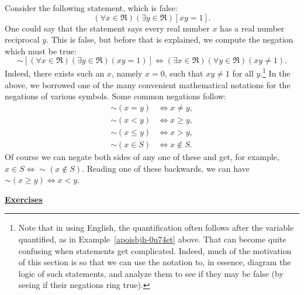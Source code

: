 \bex Consider the following statement, which is false:
$$(\forall x\in\Re)(\exists y\in \Re)[xy=1].$$
One could say that the statement says every real number $x$ has
a real number reciprocal $y$.  This is false, but before
that is explained, we compute the negation which must be true:
$$\sim[(\forall x\in\Re)(\exists y\in \Re)(xy=1)]
\iff(\exists x\in\Re)(\forall y\in\Re)(xy\ne 1).$$
Indeed, there exists such an $x$, namely $x=0$, such that $xy\ne 1$ for all 
$y$.\footnote{%
Note that in using English, the quantification often
follows after the variable quantified, as in 
Example~\ref{apoisbjh-0u74et} above.  That can become quite confusing
when statements get complicated.  Indeed, much of the motivation
of this section is so that we can use the notation to, in essence,
diagram the logic of such statements, and analyze them to see
if they may be false (by seeing if their negations ring true).%
}
\label{apoisbjh-0u74et}
\eex
In the above, we borrowed one of the many
convenient mathematical notations for the negations of various
symbols.
Some common negations follow:
\begin{align*}
\sim(x=y)&\iff x\ne y,\\
\sim(x<y)&\iff x\ge y,\\
\sim(x\le y)&\iff x>y,\\
\sim(x\in S)&\iff x\not\in S.\end{align*}
Of course we can negate both sides of any one of these and get,
for example, $x\in S\iff\sim(x\not\in S)$.  Reading one
of these backwards, we can have 
$\sim(x\ge y)\iff x<y$.


\begin{center}\underline{\Large{\bf Exercises}}\end{center}
\bigskip


